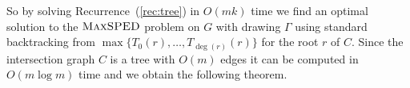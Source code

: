 \documentclass[a4paper,english,numberwithinsect]{eurocg18}
\newcommand{\maxsped}{\ensuremath{\textsc{MaxSPED}}\xspace}
\newcommand{\sollong}{\ensuremath{\textit{long}}\xspace}
\newcommand{\solshort}{\ensuremath{\textit{short}}\xspace}
\begin{document}
%

So by solving Recurrence~(\ref{rec:tree}) in $O(mk)$ time we find an optimal solution to the \maxsped problem on $ G $ with drawing $ \Gamma $ using standard backtracking from $\max\{T_0(r), \dots, T_{\deg(r)}(r)\}$ for the root $r$ of $C$.	
Since the intersection graph $C$ is a tree with $O(m)$ edges it can be computed in $O(m \log m)$ time and we obtain the following theorem.
\end{document}
